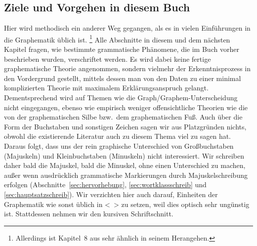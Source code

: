 \subsection{Ziele und Vorgehen in diesem Buch}

Hier wird methodisch ein anderer Weg gegangen, als es in vielen Einführungen in die Graphematik üblich ist.%
\footnote{Allerdings ist Kapitel~8 aus \citet{Eisenberg1} sehr ähnlich in seinem Herangehen.}
Alle Abschnitte in diesem und dem nächsten Kapitel fragen, wie bestimmte grammatische Phänomene, die im Buch vorher beschrieben wurden, verschriftet werden.
Es wird dabei keine fertige graphematische Theorie angenommen, sondern vielmehr der Erkenntnisprozess in den Vordergrund gestellt, mittels dessen man von den Daten zu einer minimal komplizierten Theorie mit maximalem Erklärungsanspruch gelangt.
Dementsprechend wird auf Themen wie \zB die Graph\slash Graphem-Unterscheidung nicht eingegangen, ebenso wie empirisch weniger offensichtliche Theorien wie die von der graphematischen Silbe bzw.\ dem graphematischen Fuß.
Auch über die Form der Buchstaben und sonstigen Zeichen sagen wir aus Platzgründen nichts, obwohl die existierende Literatur auch zu diesem Thema viel zu sagen hat.
Daraus folgt, dass uns der rein graphische Unterschied von Großbuchstaben (Majuskeln) und Kleinbuchstaben (Minuskeln) nicht interessiert.
Wir schreiben daher bald die Majuskel, bald die Minuskel, ohne einen Unterschied zu machen, außer wenn ausdrücklich grammatische Markierungen durch Majuskelschreibung erfolgen (Abschnitte~\ref{sec:hervorhebung}, \ref{sec:wortklassschreib} und \ref{sec:hauptsatzschreib}).
Wir verzichten hier auch darauf, Einheiten der Graphematik wie sonst üblich in <~> zu setzen, weil dies optisch sehr ungünstig ist.
Stattdessen nehmen wir den kursiven Schriftschnitt.

